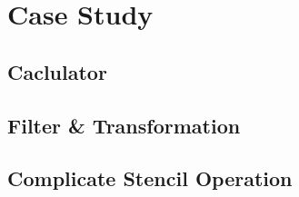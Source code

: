 \section{Case Study}


\subsection{Caclulator}




\subsection{Filter \& Transformation}



\subsection{Complicate Stencil Operation}





